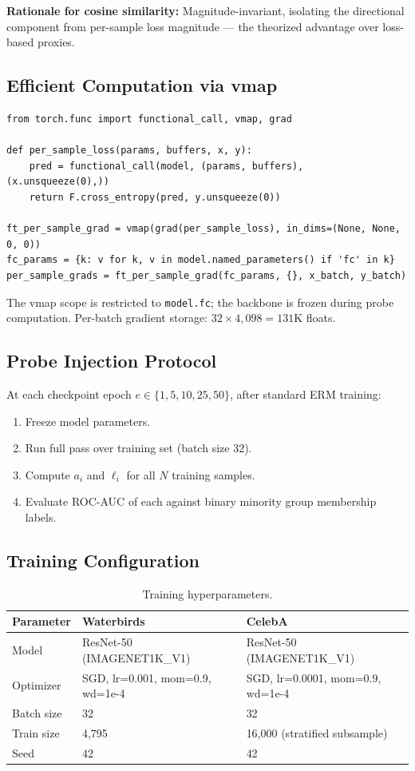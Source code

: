 \textbf{Rationale for cosine similarity:} Magnitude-invariant, isolating the directional component from per-sample loss magnitude --- the theorized advantage over loss-based proxies.

\subsection{Efficient Computation via vmap}

\begin{verbatim}
from torch.func import functional_call, vmap, grad

def per_sample_loss(params, buffers, x, y):
    pred = functional_call(model, (params, buffers), (x.unsqueeze(0),))
    return F.cross_entropy(pred, y.unsqueeze(0))

ft_per_sample_grad = vmap(grad(per_sample_loss), in_dims=(None, None, 0, 0))
fc_params = {k: v for k, v in model.named_parameters() if 'fc' in k}
per_sample_grads = ft_per_sample_grad(fc_params, {}, x_batch, y_batch)
\end{verbatim}

The vmap scope is restricted to \texttt{model.fc}; the backbone is frozen during probe computation.
Per-batch gradient storage: $32 \times 4{,}098 = 131\text{K}$ floats.

\subsection{Probe Injection Protocol}

At each checkpoint epoch $e \in \{1, 5, 10, 25, 50\}$, after standard ERM training:
\begin{enumerate}
  \item Freeze model parameters.
  \item Run full pass over training set (batch size 32).
  \item Compute $a_i$ and $\ell_i$ for all $N$ training samples.
  \item Evaluate ROC-AUC of each against binary minority group membership labels.
\end{enumerate}

\subsection{Training Configuration}

\begin{table}[h]
\centering
\caption{Training hyperparameters.}
\label{tab:training}
\begin{tabular}{lll}
\toprule
\textbf{Parameter} & \textbf{Waterbirds} & \textbf{CelebA} \\
\midrule
Model & ResNet-50 (IMAGENET1K\_V1) & ResNet-50 (IMAGENET1K\_V1) \\
Optimizer & SGD, lr=0.001, mom=0.9, wd=1e-4 & SGD, lr=0.0001, mom=0.9, wd=1e-4 \\
Batch size & 32 & 32 \\
Train size & 4,795 & 16,000 (stratified subsample) \\
Seed & 42 & 42 \\
\bottomrule
\end{tabular}
\end{table}

